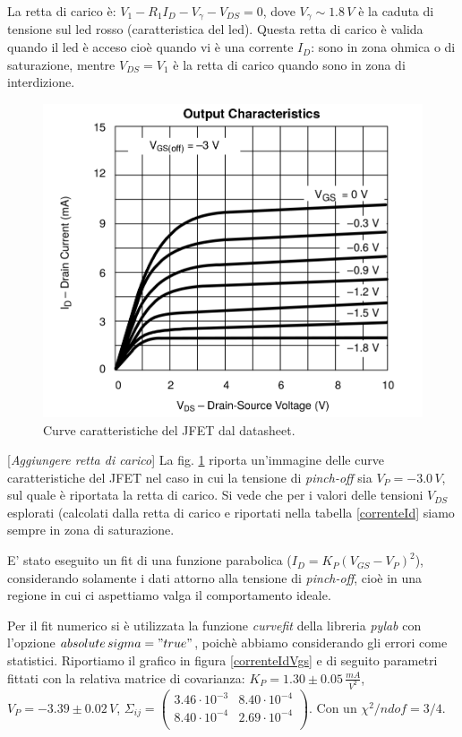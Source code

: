 \documentclass[10pt,a4paper]{article}
\newcommand{\rem}[1]{[\emph{#1}]}
\begin{document}
La retta di carico è: $V_1 - R_1 I_D-V_{\gamma}-V_{DS} = 0$, dove $V_{\gamma} \sim 1.8 \, V$ è la caduta di tensione sul led rosso (caratteristica del led). Questa retta di carico è valida quando il led è acceso cioè quando vi è una corrente $I_D$: sono in zona ohmica o di saturazione, mentre $V_{DS} = V_1$ è la retta di carico quando sono in zona di interdizione.\\

\begin{figure}
\centering
\includegraphics[scale=0.4]{char2.png}
\caption{Curve caratteristiche del JFET dal datasheet.\label{curveCaratteristiche}}
\end{figure}

\rem{Aggiungere retta di carico}
La fig. \ref{curveCaratteristiche} riporta un'immagine delle curve caratteristiche del JFET nel caso in cui la tensione di \emph{pinch-off} sia $V_P = -3.0\,V$, sul quale è riportata la retta di carico. Si vede che per i valori delle tensioni $V_{DS}$ esplorati (calcolati dalla retta di carico e riportati nella tabella \ref{correnteId} siamo sempre in zona di saturazione. 

E' stato eseguito un fit di una funzione parabolica ($I_D = K_P (V_{GS} - V_P)^2$), considerando solamente i dati attorno alla tensione di \emph{pinch-off}, cioè in una regione in cui ci aspettiamo valga il comportamento ideale. 

Per il fit numerico si è utilizzata la funzione \emph{curvefit} della libreria \emph{pylab} con l'opzione \emph{$absolute\,sigma = "true"$}, poichè abbiamo considerando gli errori come statistici. Riportiamo il grafico in figura \ref{correnteIdVgs} e di seguito parametri fittati con la relativa matrice di covarianza: $K_P = 1.30 \pm 0.05 \, \frac{mA}{V^2}$, $V_P = -3.39 \pm 0.02 \, V$,  $ \Sigma_{ij} = \left( \begin{array}{cc}
3.46 \cdot 10^{-3} & 8.40 \cdot 10^{-4} \\ 
8.40 \cdot 10^{-4} & 2.69 \cdot 10^{-4}\\
\end{array} \right)$. Con un $\chi^2/ndof = 3/4$.
\end{document}
